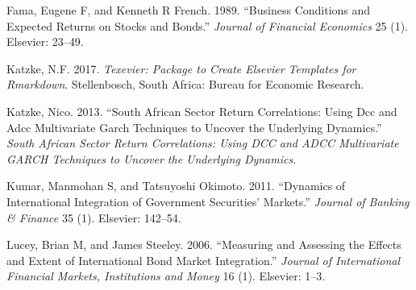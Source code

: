 \documentclass[11pt,preprint, authoryear]{elsarticle}
\numberwithin{equation}{section}
\numberwithin{figure}{section}
\numberwithin{table}{section}
\begin{document}
\hypertarget{ref-FRENCH}{}
Fama, Eugene F, and Kenneth R French. 1989. ``Business Conditions and
Expected Returns on Stocks and Bonds.'' \emph{Journal of Financial
Economics} 25 (1). Elsevier: 23--49.

\hypertarget{ref-Texevier}{}
Katzke, N.F. 2017. \emph{Texevier: Package to Create Elsevier Templates
for Rmarkdown}. Stellenbosch, South Africa: Bureau for Economic
Research.

\hypertarget{ref-katzke2013}{}
Katzke, Nico. 2013. ``South African Sector Return Correlations: Using
Dcc and Adcc Multivariate Garch Techniques to Uncover the Underlying
Dynamics.'' \emph{South African Sector Return Correlations: Using DCC
and ADCC Multivariate GARCH Techniques to Uncover the Underlying
Dynamics}.

\hypertarget{ref-kumar2011}{}
Kumar, Manmohan S, and Tatsuyoshi Okimoto. 2011. ``Dynamics of
International Integration of Government Securities' Markets.''
\emph{Journal of Banking \& Finance} 35 (1). Elsevier: 142--54.

\hypertarget{ref-lucey2006}{}
Lucey, Brian M, and James Steeley. 2006. ``Measuring and Assessing the
Effects and Extent of International Bond Market Integration.''
\emph{Journal of International Financial Markets, Institutions and
Money} 16 (1). Elsevier: 1--3.




\end{document}
